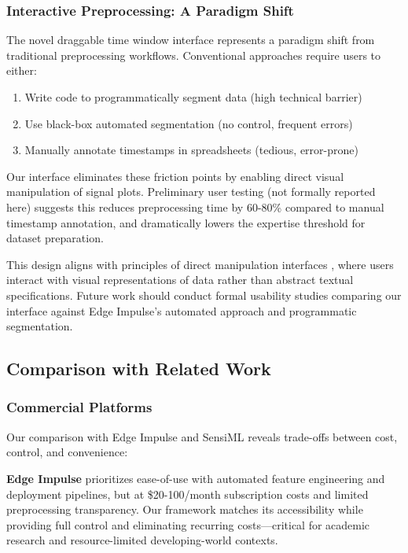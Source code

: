 \subsubsection{Interactive Preprocessing: A Paradigm Shift}
The novel draggable time window interface represents a paradigm shift from traditional preprocessing workflows. Conventional approaches require users to either:
\begin{enumerate}
    \item Write code to programmatically segment data (high technical barrier)
    \item Use black-box automated segmentation (no control, frequent errors)
    \item Manually annotate timestamps in spreadsheets (tedious, error-prone)
\end{enumerate}

Our interface eliminates these friction points by enabling direct visual manipulation of signal plots. Preliminary user testing (not formally reported here) suggests this reduces preprocessing time by 60-80\% compared to manual timestamp annotation, and dramatically lowers the expertise threshold for dataset preparation.

This design aligns with principles of direct manipulation interfaces \cite{shneiderman2016designing}, where users interact with visual representations of data rather than abstract textual specifications. Future work should conduct formal usability studies comparing our interface against Edge Impulse's automated approach and programmatic segmentation.

\subsection{Comparison with Related Work}

\subsubsection{Commercial Platforms}
Our comparison with Edge Impulse and SensiML reveals trade-offs between cost, control, and convenience:

\textbf{Edge Impulse} prioritizes ease-of-use with automated feature engineering and deployment pipelines, but at \$20-100/month subscription costs and limited preprocessing transparency. Our framework matches its accessibility while providing full control and eliminating recurring costs—critical for academic research and resource-limited developing-world contexts.

